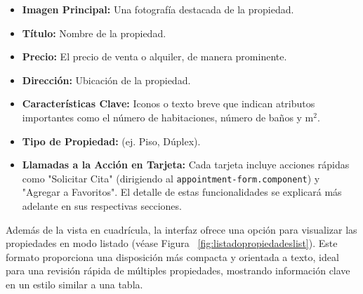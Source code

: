 \begin{enumerate}
\begin{enumerate}
        \begin{itemize}
            \item \textbf{Imagen Principal:} Una fotografía destacada de la propiedad.
            
            \item \textbf{Título:} Nombre de la propiedad.
            
            \item \textbf{Precio:} El precio de venta o alquiler, de manera prominente.
            \item \textbf{Dirección:} Ubicación de la propiedad.
            
            \item \textbf{Características Clave:} Iconos o texto breve que indican atributos importantes como el número de habitaciones, número de baños y m$^2$.
            
            \item \textbf{Tipo de Propiedad:} (ej. Piso, Dúplex).

             \item \textbf{Llamadas a la Acción en Tarjeta:} Cada tarjeta incluye acciones rápidas como "Solicitar Cita" (dirigiendo al \texttt{appointment-form.component}) y "Agregar a Favoritos". El detalle de estas funcionalidades se explicará más adelante en sus respectivas secciones.
        \end{itemize}

        Además de la vista en cuadrícula, la interfaz ofrece una opción para visualizar las propiedades en modo listado (véase Figura ~\ref{fig:listadopropiedadeslist}). Este formato proporciona una disposición más compacta y orientada a texto, ideal para una revisión rápida de múltiples propiedades, mostrando información clave en un estilo similar a una tabla.


\end{enumerate}
\end{enumerate}
